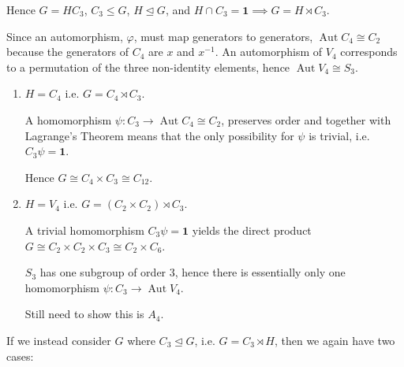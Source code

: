 \documentclass[a4paper, oneside, 12pt, final]{article}
\theoremstyle{definition}
\DeclareMathOperator{\Aut}{Aut}
\begin{document}
Hence \(G = H C_3\), \(C_3 \leqslant G\), \(H \unlhd G\), and \(H \cap C_3 =
\bm{1} \implies G = H \rtimes C_3\).

Since an automorphism, \(\varphi\), must map generators to generators,
\(\Aut{C_4} \cong C_2\) because the generators of \(C_4\) are \(x\) and
\(x^{-1}\).
An automorphism of \(V_4\) corresponds to a permutation of the three
non-identity elements, hence \(\Aut{V_4} \cong S_3\).

\begin{enumerate}
    \item \(H = C_4\) i.e. \(G = C_4 \rtimes C_3\).

        A homomorphism \(\psi:C_3 \to \Aut{C_4} \cong C_2\), preserves order
        and together with Lagrange's Theorem means that the only possibility
        for \(\psi\) is trivial, i.e. \(C_3\psi = \bm{1}\).

        Hence \(G \cong C_4 \times C_3 \cong C_{12}\).

    \item \(H = V_4\) i.e. \(G = (C_2 \times C_2) \rtimes C_3\).

        A trivial homomorphism \(C_3\psi = \bm{1}\) yields the direct product
        \(G \cong C_2 \times C_2 \times C_3 \cong C_2 \times C_6\).

        \(S_3\) has one subgroup of order 3, hence there is essentially only
        one homomorphism \(\psi:C_3 \to \Aut{V_4}\).

        Still need to show this is \(A_4\).
\end{enumerate}

If we instead consider \(G\) where \(C_3 \unlhd G\), i.e. \(G = C_3 \rtimes H\), then we again have two cases:
\end{document}
